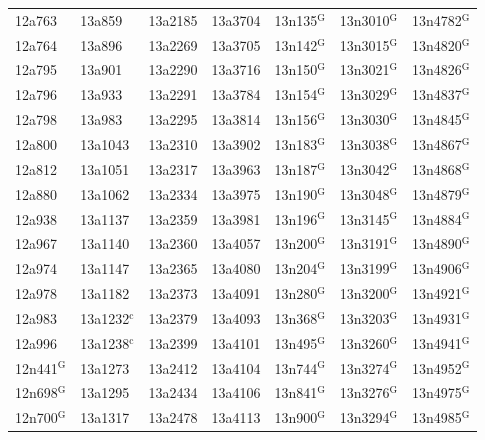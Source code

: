 \documentclass[12pt, oneside]{amsart}
\begin{document}
{\begin{longtable}{*{7}{>{\raggedright\arraybackslash}p{}}}
12a763 & 13a859 & 13a2185 & 13a3704 & 13n135$^{\mathrm{G}}$ & 13n3010$^{\mathrm{G}}$ & 13n4782$^{\mathrm{G}}$ \\
12a764 & 13a896 & 13a2269 & 13a3705 & 13n142$^{\mathrm{G}}$ & 13n3015$^{\mathrm{G}}$ & 13n4820$^{\mathrm{G}}$ \\
12a795 & 13a901 & 13a2290 & 13a3716 & 13n150$^{\mathrm{G}}$ & 13n3021$^{\mathrm{G}}$ & 13n4826$^{\mathrm{G}}$ \\
12a796 & 13a933 & 13a2291 & 13a3784 & 13n154$^{\mathrm{G}}$ & 13n3029$^{\mathrm{G}}$ & 13n4837$^{\mathrm{G}}$ \\
12a798 & 13a983 & 13a2295 & 13a3814 & 13n156$^{\mathrm{G}}$ & 13n3030$^{\mathrm{G}}$ & 13n4845$^{\mathrm{G}}$ \\
12a800 & 13a1043 & 13a2310 & 13a3902 & 13n183$^{\mathrm{G}}$ & 13n3038$^{\mathrm{G}}$ & 13n4867$^{\mathrm{G}}$ \\
12a812 & 13a1051 & 13a2317 & 13a3963 & 13n187$^{\mathrm{G}}$ & 13n3042$^{\mathrm{G}}$ & 13n4868$^{\mathrm{G}}$ \\
12a880 & 13a1062 & 13a2334 & 13a3975 & 13n190$^{\mathrm{G}}$ & 13n3048$^{\mathrm{G}}$ & 13n4879$^{\mathrm{G}}$ \\
12a938 & 13a1137 & 13a2359 & 13a3981 & 13n196$^{\mathrm{G}}$ & 13n3145$^{\mathrm{G}}$ & 13n4884$^{\mathrm{G}}$ \\
12a967 & 13a1140 & 13a2360 & 13a4057 & 13n200$^{\mathrm{G}}$ & 13n3191$^{\mathrm{G}}$ & 13n4890$^{\mathrm{G}}$ \\
12a974 & 13a1147 & 13a2365 & 13a4080 & 13n204$^{\mathrm{G}}$ & 13n3199$^{\mathrm{G}}$ & 13n4906$^{\mathrm{G}}$ \\
12a978 & 13a1182 & 13a2373 & 13a4091 & 13n280$^{\mathrm{G}}$ & 13n3200$^{\mathrm{G}}$ & 13n4921$^{\mathrm{G}}$ \\
12a983 & 13a1232$^{\mathrm{c}}$ & 13a2379 & 13a4093 & 13n368$^{\mathrm{G}}$ & 13n3203$^{\mathrm{G}}$ & 13n4931$^{\mathrm{G}}$ \\
12a996 & 13a1238$^{\mathrm{c}}$ & 13a2399 & 13a4101 & 13n495$^{\mathrm{G}}$ & 13n3260$^{\mathrm{G}}$ & 13n4941$^{\mathrm{G}}$ \\
12n441$^{\mathrm{G}}$ & 13a1273 & 13a2412 & 13a4104 & 13n744$^{\mathrm{G}}$ & 13n3274$^{\mathrm{G}}$ & 13n4952$^{\mathrm{G}}$ \\
12n698$^{\mathrm{G}}$ & 13a1295 & 13a2434 & 13a4106 & 13n841$^{\mathrm{G}}$ & 13n3276$^{\mathrm{G}}$ & 13n4975$^{\mathrm{G}}$ \\
12n700$^{\mathrm{G}}$ & 13a1317 & 13a2478 & 13a4113 & 13n900$^{\mathrm{G}}$ & 13n3294$^{\mathrm{G}}$ & 13n4985$^{\mathrm{G}}$ \\

\end{longtable}}
\end{document}
